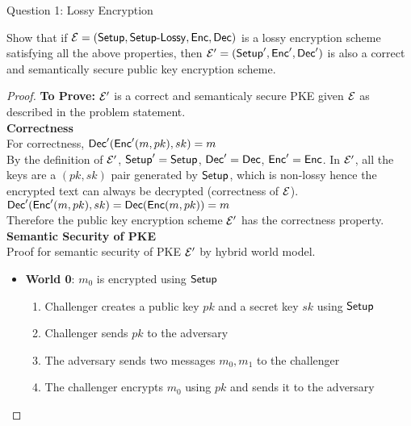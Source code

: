 \begin{solution}{Question 1: Lossy Encryption}\label{ques:1}
    \begin{question}
    Show that if $\mathcal{E} = (\mathsf{Setup}, \mathsf{Setup\text{-}Lossy}, \mathsf{Enc}, \mathsf{Dec})$ is a lossy encryption scheme
satisfying all the above properties, then $\mathcal{E}' = (\mathsf{Setup}', \mathsf{Enc}', \mathsf{Dec}')$ is also a correct
and semantically secure public key encryption scheme.
    \end{question}
    \tcblower{}
    \begin{proof}
    \textbf{To Prove:} $\mathcal{E}'$ is a correct and semanticaly secure PKE given $\mathcal{E}$ as described in the problem statement.\\
    \textbf{Correctness}\\
    For correctness, $\mathsf{Dec}'(\mathsf{Enc}'(m, pk), sk) = m$\\
    By the definition of $\mathcal{E}'$, $\mathsf{Setup}' = \mathsf{Setup}$, $\mathsf{Dec}' = \mathsf{Dec}$, $\mathsf{Enc}' = \mathsf{Enc}$. In $\mathcal{E}'$, all the keys are a $(pk,sk)$ pair generated by $\mathsf{Setup}$, which is non-lossy hence the encrypted text can always be decrypted (correctness of $\mathcal{E}$).\\
    $\mathsf{Dec}'(\mathsf{Enc}'(m, pk), sk) = \mathsf{Dec}(\mathsf{Enc}(m,pk))=m$\\
    Therefore the public key encryption scheme $\mathcal{E}'$ has the correctness property.\\
    \newline
    \textbf{Semantic Security of PKE}\\
    Proof for semantic security of PKE $\mathcal{E}'$ by hybrid world model.
    \begin{itemize}
        \item \textbf{World 0}: $m_0$ is encrypted using $\mathsf{Setup}$
        \begin{enumerate}
            \item Challenger creates a public key $pk$ and a secret key $sk$ using $\mathsf{Setup}$
            \item Challenger sends $pk$ to the adversary
            \item The adversary sends two messages $m_0, m_1$ to the challenger
            \item The challenger encrypts $m_0$ using $pk$ and sends it to the adversary
        \end{enumerate}
        

\end{itemize}
\end{proof}
\end{solution}
